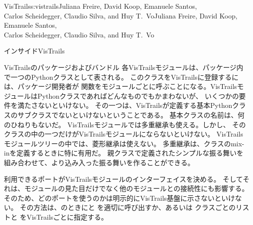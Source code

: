 \begin{aosachaptertoc}{VisTrails}{s:vistrails}{Juliana Freire, David Koop, Emanuele Santos, \\ Carlos Scheidegger, Claudio Silva, and Huy T.\ Vo}{Juliana Freire, David Koop, Emanuele Santos, \\ \hspace*{0.9cm} Carlos Scheidegger, Claudio Silva, and Huy T.\ Vo}
\begin{aosasect1}{インサイドVisTrails}
\begin{aosasect2}{VisTrailsのパッケージおよびバンドル}
各VisTrailsモジュールは、パッケージ内で一つのPythonクラスとして表される。
このクラスをVisTrailsに登録するには、パッケージ開発者が
関数をモジュールごとに呼ぶことになる。VisTrailsモジュールはPythonクラスであればどんなものでもかまわないが、
いくつかの要件を満たさないといけない。
その一つは、VisTrailsが定義する基本Pythonクラスのサブクラスでないといけないということである。
基本クラスの名前は、何のひねりもないだ。
VisTrailsモジュールでは多重継承も使える。しかし、
そのクラスの中の一つだけがVisTrailsモジュールにならないといけない。
VisTrailsモジュールツリーの中では、菱形継承は使えない。
多重継承は、クラスのmix-inを定義するときに特に有用だ。
親クラスで定義されたシンプルな振る舞いを組み合わせて、より込み入った振る舞いを作ることができる。

利用できるポートがVisTrailsモジュールのインターフェイスを決める。
そしてそれは、モジュールの見た目だけでなく他のモジュールとの接続性にも影響する。
そのため、どのポートを使うのかは明示的にVisTrails基盤に示さないといけない。
その方法は、のときにと
を適切に呼び出すか、あるいは
クラスごとのリストと
をVisTrailsごとに指定する。


\end{aosasect2}
\end{aosasect1}
\end{aosachaptertoc}
